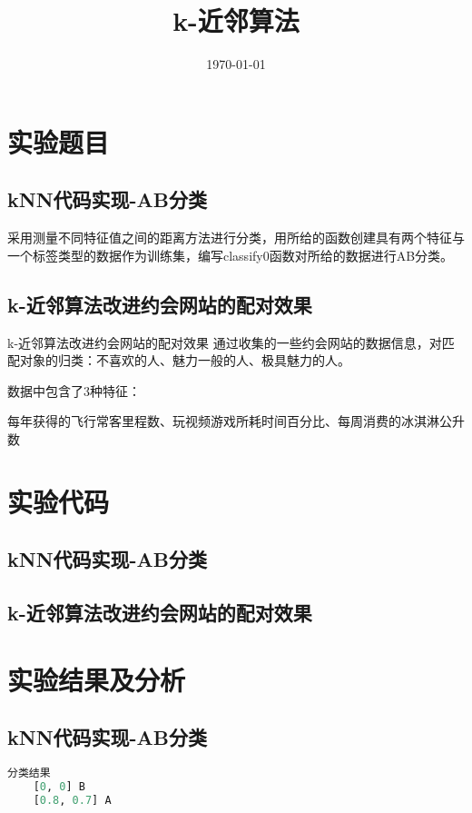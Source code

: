 \documentclass{../source/Experiment}
\title{k-近邻算法}
\date{\today}
\begin{document}
    \makecover
    \section{实验题目}
        \subsection{kNN代码实现-AB分类}
        采用测量不同特征值之间的距离方法进行分类，用所给的函数创建具有两个特征与一个标签类型的数据作为训练集，编写classify0函数对所给的数据进行AB分类。
        \subsection{k-近邻算法改进约会网站的配对效果}
    k-近邻算法改进约会网站的配对效果
    通过收集的一些约会网站的数据信息，对匹配对象的归类：不喜欢的人、魅力一般的人、极具魅力的人。

    数据中包含了3种特征：

    每年获得的飞行常客里程数、玩视频游戏所耗时间百分比、每周消费的冰淇淋公升数
    
    \section{实验代码}
    \subsection{kNN代码实现-AB分类}
    

    \subsection{k-近邻算法改进约会网站的配对效果}
    
    \section{实验结果及分析}
    \subsection{kNN代码实现-AB分类}
    \begin{lstlisting}[language=Python]
    分类结果
    [0, 0] B
    [0.8, 0.7] A
    \end{lstlisting}
\end{document}
